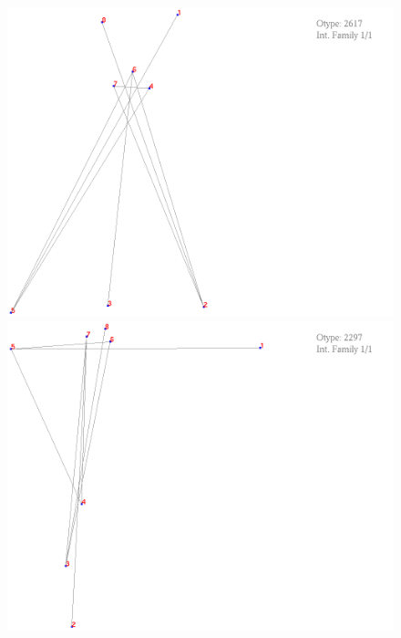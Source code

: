 \documentclass[11pt,epsf,times,letterpaper]{article}
\begin{document}
	\begin{figure}
		\includegraphics[scale=.4]{if_tam0_tam1/13.png}
		\includegraphics[scale=.4]{if_tam0_tam1/14.png}
	\end{figure}
		
\end{document}
